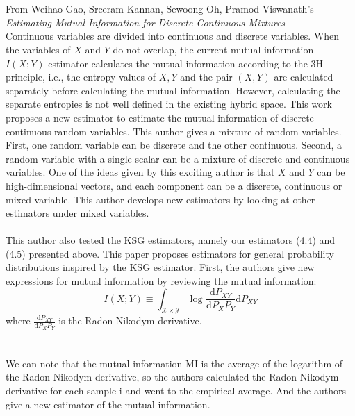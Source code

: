 \\ \hspace*{\fill} \\
From Weihao Gao, Sreeram Kannan, Sewoong Oh, Pramod Viswanath's \emph{Estimating Mutual Information for Discrete-Continuous Mixtures} \cite{gao2018estimating}\\
Continuous variables are divided into continuous and discrete variables. When the variables of $X$ and $Y$ do not overlap, the current mutual information $I(X; Y)$ estimator calculates the mutual information according to the 3H principle, i.e., the entropy values of $X, Y$ and the pair $(X, Y)$ are calculated separately before calculating the mutual information. However, calculating the separate entropies is not well defined in the existing hybrid space. This work proposes a new estimator to estimate the mutual information of discrete-continuous random variables. This author gives a mixture of random variables. First, one random variable can be discrete and the other continuous. Second, a random variable with a single scalar can be a mixture of discrete and continuous variables. One of the ideas given by this exciting author is that $X$ and $Y$ can be high-dimensional vectors, and each component can be a discrete, continuous or mixed variable. This author develops new estimators by looking at other estimators under mixed variables.
\\ \hspace*{\fill} \\
This author also tested the KSG estimators, namely our estimators (4.4) and (4.5) presented above. This paper proposes estimators for general probability distributions inspired by the KSG estimator. First, the authors give new expressions for mutual information by reviewing the mutual information:
\begin{equation}
I(X;Y) \equiv   \int_{\mathcal{X}\times \mathcal{Y}}^{}\log_{}{\frac{\mathrm{d}P_{XY} }{\mathrm{d}P_{X} P_{Y}}\mathrm{d}P_{XY}  } 
\end{equation}
where $\frac{\mathrm{d}P_{XY}}{\mathrm{d}P_{X} P_{Y}}$ is the Radon-Nikodym derivative. \\
\\ \hspace*{\fill} \\
We can note that the mutual information MI is the average of the logarithm of the Radon-Nikodym derivative, so the authors calculated the Radon-Nikodym derivative for each sample i and went to the empirical average. And the authors give a new estimator of the mutual information.

